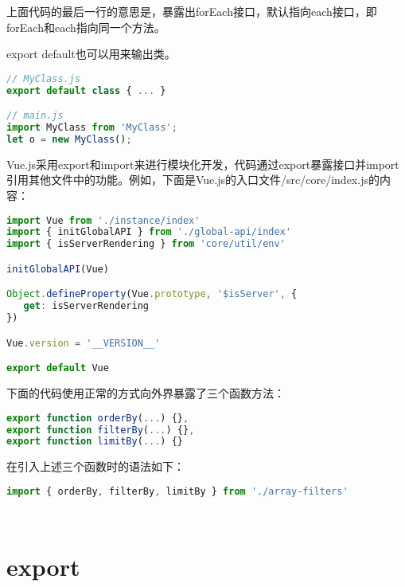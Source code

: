 上面代码的最后一行的意思是，暴露出forEach接口，默认指向each接口，即forEach和each指向同一个方法。

export default也可以用来输出类。

\begin{lstlisting}[language=JavaScript]
// MyClass.js
export default class { ... }

// main.js
import MyClass from 'MyClass';
let o = new MyClass();
\end{lstlisting}

Vue.js采用export和import来进行模块化开发，代码通过export暴露接口并import引用其他文件中的功能。例如，下面是Vue.js的入口文件/src/core/index.js的内容：

\begin{lstlisting}[language=JavaScript]
import Vue from './instance/index'
import { initGlobalAPI } from './global-api/index'
import { isServerRendering } from 'core/util/env'

initGlobalAPI(Vue)

Object.defineProperty(Vue.prototype, '$isServer', {
   get: isServerRendering
})

Vue.version = '__VERSION__'

export default Vue
\end{lstlisting}

下面的代码使用正常的方式向外界暴露了三个函数方法：

\begin{lstlisting}[language=JavaScript]
export function orderBy(...) {},
export function filterBy(...) {},
export function limitBy(...) {}
\end{lstlisting}

在引入上述三个函数时的语法如下：



\begin{lstlisting}[language=JavaScript]
import { orderBy, filterBy, limitBy } from './array-filters'
\end{lstlisting}


\begin{lstlisting}[language=JavaScript]

\end{lstlisting}




\begin{lstlisting}[language=JavaScript]

\end{lstlisting}

\section{export}

